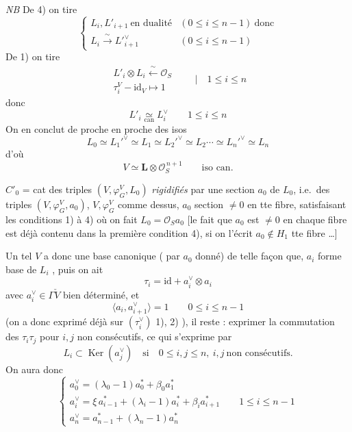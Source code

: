 \documentclass[11pt,a4paper]{article}
\begin{document}
\emph{NB} De 4) on tire
\[
\left\lbrace
\begin{array}{ll}
L_i, L'_{i+1} \ \text{en dualité} & (0 \leq i \leq n-1) \ \text{donc} \\
L_i \xrightarrow{\ \sim\ } L'^{\vee}_{i+1} & (0 \leq i \leq n-1)
\end{array}
\right.
\]
De 1) on tire
\[
\begin{array}{l}
L'_i \otimes L_i \xleftarrow{\ \sim\ } \mathcal{O}_S \\
\tau^{V}_{i} - \mathrm{id}_V \longmapsto 1
\end{array}
\qquad \Big\vert \quad 1 \leq i \leq n
\]
 donc
\[
L'_i \underset{\mathrm{can}}{\simeq} L_i^{\vee} \qquad 1 \leq i \leq n
\]
On en conclut de proche en proche des isos
\[
L_0 \simeq L_1'^{\vee} \simeq L_1 \simeq L_2'^{\vee} \simeq L_2 \cdots
\simeq L_n'^{\vee} \simeq L_n
\]
d'où
\[
V \simeq \mathbf{L} \otimes \mathcal{O}_S^{\,n+1} \qquad \text{iso can.}
\]

$\boxed{C'_0}$ = cat des triples $(V, \varphi^{V}_{G}, L_0)$ \emph{rigidifiés}
par une section  $a_0$ de $L_0$, i.e.\ des triples
$(V, \varphi^{V}_{G}, a_0)$,  $V, \varphi^{V}_{G}$ comme
dessus, $a_0$ section $\neq 0$ en tte fibre, satisfaisant les conditions 1) à
4) où on fait $L_0 = \mathcal{O}_S a_0$ [le fait que $a_0$ est $\neq 0$ en
chaque fibre est déjà contenu dans \struck{\ill{}} la première condition 4),
si on l'écrit $a_0 \notin H_1$  tte fibre \ldots]

Un tel $V$ a donc une base canonique 
( par  $a_0$ donné) de telle façon que,
 $a_i$ forme base de $L_i$ ,
\struck{\ill{}} puis on ait
\[
\tau_i = \mathrm{id} + a_i^{\vee} \otimes a_i
\]
avec $a_i^{\vee} \in \Gamma \check{V}$ bien déterminé, et
\[
\langle a_i, a_{i+1}^{\vee} \rangle = 1 \qquad 0 \leq i \leq n-1
\]
(on a donc exprimé déjà  sur $(\tau_i^{\vee})$ 1), 2)
), il  reste : exprimer
\struck{\ill{}} la commutation des $\tau_i \tau_j$ pour $i, j$ non
consécutifs, ce qui s'exprime par
\[
L_i \subset \operatorname{Ker}(a_j^{\vee}) \quad \text{si} \quad
0 \leq i, j \leq n, \ i, j \ \text{non consécutifs.}
\]
On aura donc
\[
\left\lbrace
\begin{array}{l}
a_0^{\vee} = (\lambda_0 - 1) a_0^{*} + \beta_0 a_1^{*} \\[4pt]
a_i^{\vee} = \xi\, a_{i-1}^{*} + (\lambda_i - 1) a_i^{*} + \beta_i a_{i+1}^{*}
\qquad 1 \leq i \leq n-1 \\[4pt]
a_n^{\vee} = a_{n-1}^{*} + (\lambda_n - 1) a_n^{*}
\end{array}
\right.
\]
\end{document}
